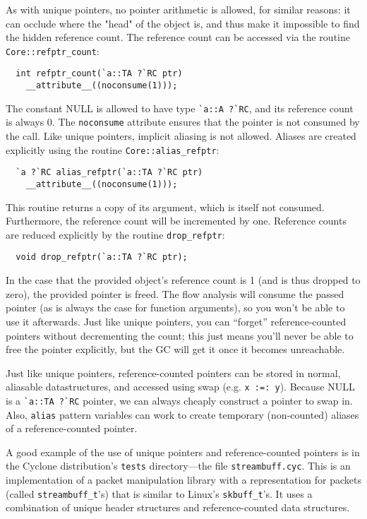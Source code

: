 As with unique pointers, no pointer arithmetic is allowed, for similar
reasons: it can occlude where the "head" of the object is, and thus make
it impossible to find the hidden reference count.  The reference count
can be accessed via the routine \texttt{Core::refptr_count}:
\begin{verbatim}
  int refptr_count(`a::TA ?`RC ptr)
    __attribute__((noconsume(1)));
\end{verbatim} %
The constant NULL is allowed to have type \verb+`a::A ?`RC+, and its
reference count is always 0.  The \texttt{noconsume} attribute ensures that
the pointer is not consumed by the call.  Like unique pointers, implicit
aliasing is not allowed.  Aliases are created explicitly using the routine
\texttt{Core::alias_refptr}:
\begin{verbatim}
  `a ?`RC alias_refptr(`a::TA ?`RC ptr)
    __attribute__((noconsume(1)));
\end{verbatim} %
This routine returns a copy of its argument, which is itself not consumed.
Furthermore, the reference count will be incremented by one.  Reference
counts are reduced explicitly by the routine \texttt{drop_refptr}:
\begin{verbatim}
  void drop_refptr(`a::TA ?`RC ptr);
\end{verbatim}
In the case that the provided object's reference count is 1 (and is thus
dropped to zero), the provided pointer is freed.  The flow analysis will
consume the passed pointer (as is always the case for function arguments),
so you won't be able to use it afterwards.  Just like unique pointers, you
can ``forget'' reference-counted pointers without decrementing the count;
this just means you'll never be able to free the pointer explicitly, but the
GC will get it once it becomes unreachable.

Just like unique pointers, reference-counted pointers can be stored in
normal, aliasable datastructures, and accessed using swap (e.g. \texttt{x
:=: y}).  Because NULL is a \verb+`a::TA ?`RC+ pointer, we can always
cheaply construct a pointer to swap in.  Also, \texttt{alias} pattern
variables can work to create temporary (non-counted) aliases of a
reference-counted pointer.

A good example of the use of unique pointers and reference-counted pointers
is in the Cyclone distribution's \texttt{tests} directory---the file
\texttt{streambuff.cyc}.  This is an implementation of a packet manipulation
library with a representation for packets (called \texttt{streambuff\_t}'s)
that is similar to Linux's \texttt{skbuff\_t}'s.  It uses a combination of
unique header structures and reference-counted data structures.

